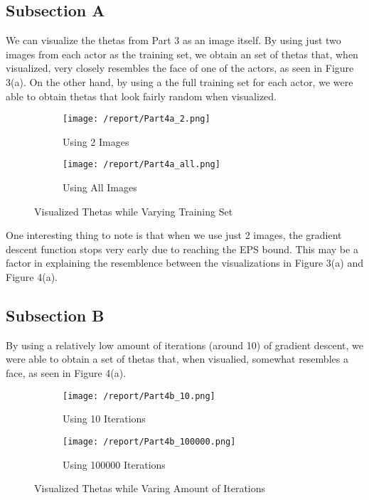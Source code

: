 \documentclass[11pt,a4paper]{report}
\begin{document}
\subsection*{Subsection A}
We can visualize the thetas from Part 3 as an image itself. By using just two images from each actor as the training set, we obtain an set of thetas that, when visualized, very closely resembles the face of one of the actors, as seen in Figure 3(a). On the other hand, by using a the full training set for each actor, we were able to obtain thetas that look fairly random when visualized.

\begin{figure}[h]
\centering
\begin{subfigure}{.5\textwidth}
  \centering
  \texttt{[image: /report/Part4a\_2.png]}
  \caption{Using 2 Images}
  \label{fig:sub1}
\end{subfigure}%
\begin{subfigure}{.5\textwidth}
  \centering
  \texttt{[image: /report/Part4a\_all.png]}
  \caption{Using All Images}
  \label{fig:sub2}
\end{subfigure}
\caption{Visualized Thetas while Varying Training Set}
\label{fig:test}
\end{figure}

One interesting thing to note is that when we use just 2 images, the gradient descent function stops very early due to reaching the EPS bound. This may be a factor in explaining the resemblence between the visualizations in Figure 3(a) and Figure 4(a).

\subsection*{Subsection B}
By using a relatively low amount of iterations (around 10) of gradient descent, we were able to obtain a set of thetas that, when visualied, somewhat resembles a face, as seen in Figure 4(a).

\begin{figure}[h]
\centering
\begin{subfigure}{.5\textwidth}
  \centering
  \texttt{[image: /report/Part4b\_10.png]}
  \caption{Using 10 Iterations}
  \label{fig:sub1}
\end{subfigure}%
\begin{subfigure}{.5\textwidth}
  \centering
  \texttt{[image: /report/Part4b\_100000.png]}
  \caption{Using 100000 Iterations}
  \label{fig:sub2}
\end{subfigure}
\caption{Visualized Thetas while Varing Amount of Iterations}
\label{fig:test}
\end{figure}
\end{document}
